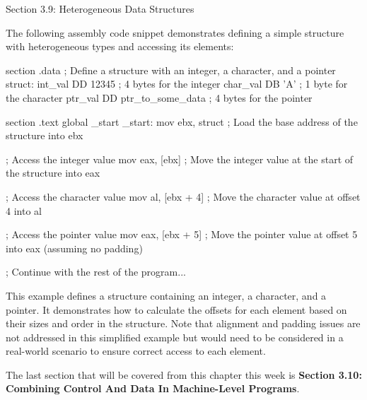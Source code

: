 \begin{notes}{Section 3.9: Heterogeneous Data Structures}
    \begin{highlight}
        The following assembly code snippet demonstrates defining a simple structure with heterogeneous types and accessing its elements:
    
    \begin{code}[Assembly]
    section .data
    ; Define a structure with an integer, a character, and a pointer
    struct:
        int_val DD 12345             ; 4 bytes for the integer
        char_val DB 'A'              ; 1 byte for the character
        ptr_val DD ptr_to_some_data  ; 4 bytes for the pointer

    section .text
    global _start
    _start:
        mov ebx, struct      ; Load the base address of the structure into ebx

        ; Access the integer value
        mov eax, [ebx]       ; Move the integer value at the start of the structure into eax

        ; Access the character value
        mov al, [ebx + 4]    ; Move the character value at offset 4 into al

        ; Access the pointer value
        mov eax, [ebx + 5]   ; Move the pointer value at offset 5 into eax (assuming no padding)

        ; Continue with the rest of the program...
    \end{code}
    
        This example defines a structure containing an integer, a character, and a pointer. It demonstrates how to calculate the offsets for each element based on their sizes and order in the structure. 
        Note that alignment and padding issues are not addressed in this simplified example but would need to be considered in a real-world scenario to ensure correct access to each element.
    \end{highlight}    
\end{notes}

The last section that will be covered from this chapter this week is \textbf{Section 3.10: Combining Control And Data In Machine-Level Programs}.


